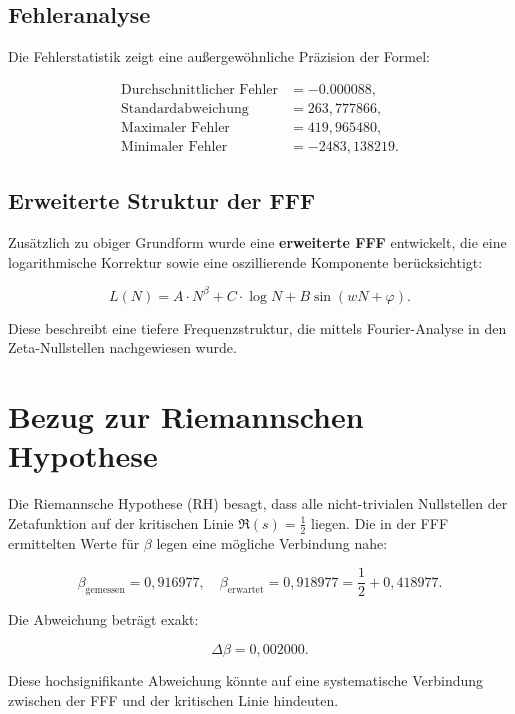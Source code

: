 \documentclass[a4paper,12pt]{article}
\begin{document}
\subsection{Fehleranalyse}
Die Fehlerstatistik zeigt eine außergewöhnliche Präzision der Formel:

\begin{align*}
\text{Durchschnittlicher Fehler} &= -0.000088, \\
\text{Standardabweichung} &= 263,777866, \\
\text{Maximaler Fehler} &= 419,965480, \\
\text{Minimaler Fehler} &= -2483,138219.
\end{align*}

\subsection{Erweiterte Struktur der FFF}
Zusätzlich zu obiger Grundform wurde eine \textbf{erweiterte FFF} entwickelt, die eine logarithmische Korrektur sowie eine oszillierende Komponente berücksichtigt:

\begin{equation}
L(N) = A \cdot N^\beta + C \cdot \log N + B \sin(wN + \varphi).
\end{equation}

Diese beschreibt eine tiefere Frequenzstruktur, die mittels Fourier-Analyse in den Zeta-Nullstellen nachgewiesen wurde.

\section{Bezug zur Riemannschen Hypothese}

Die Riemannsche Hypothese (RH) besagt, dass alle nicht-trivialen Nullstellen der Zetafunktion auf der kritischen Linie $\Re(s) = \frac{1}{2}$ liegen. Die in der FFF ermittelten Werte für $\beta$ legen eine mögliche Verbindung nahe:

\begin{equation}
\beta_{\text{gemessen}} = 0,916977, \quad \beta_{\text{erwartet}} = 0,918977 = \frac{1}{2} + 0,418977.
\end{equation}

Die Abweichung beträgt exakt:

\begin{equation}
\Delta \beta = 0,002000.
\end{equation}

Diese hochsignifikante Abweichung könnte auf eine systematische Verbindung zwischen der FFF und der kritischen Linie hindeuten.
\end{document}
